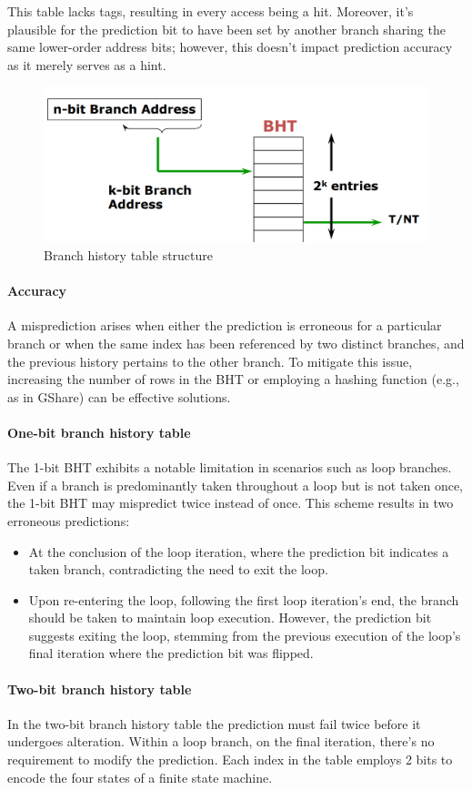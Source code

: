 This table lacks tags, resulting in every access being a hit. 
Moreover, it's plausible for the prediction bit to have been set by another branch sharing the same lower-order address bits; however, this doesn't impact prediction accuracy as it merely serves as a hint.
\begin{figure}[H]
    \centering
    \includegraphics[width=0.5\linewidth]{images/bht.png}
    \caption{Branch history table structure}
\end{figure}
\paragraph*{Accuracy}
A misprediction arises when either the prediction is erroneous for a particular branch or when the same index has been referenced by two distinct branches, and the previous history pertains to the other branch.
To mitigate this issue, increasing the number of rows in the BHT or employing a hashing function (e.g., as in GShare) can be effective solutions.

\paragraph*{One-bit branch history table}
The 1-bit BHT exhibits a notable limitation in scenarios such as loop branches. 
Even if a branch is predominantly taken throughout a loop but is not taken once, the 1-bit BHT may mispredict twice instead of once.
This scheme results in two erroneous predictions:
\begin{itemize}
    \item At the conclusion of the loop iteration, where the prediction bit indicates a taken branch, contradicting the need to exit the loop.
    \item Upon re-entering the loop, following the first loop iteration's end, the branch should be taken to maintain loop execution. 
        However, the prediction bit suggests exiting the loop, stemming from the previous execution of the loop's final iteration where the prediction bit was flipped.
\end{itemize}

\paragraph*{Two-bit branch history table}
In the two-bit branch history table the prediction must fail twice before it undergoes alteration.
Within a loop branch, on the final iteration, there's no requirement to modify the prediction.
Each index in the table employs 2 bits to encode the four states of a finite state machine.

